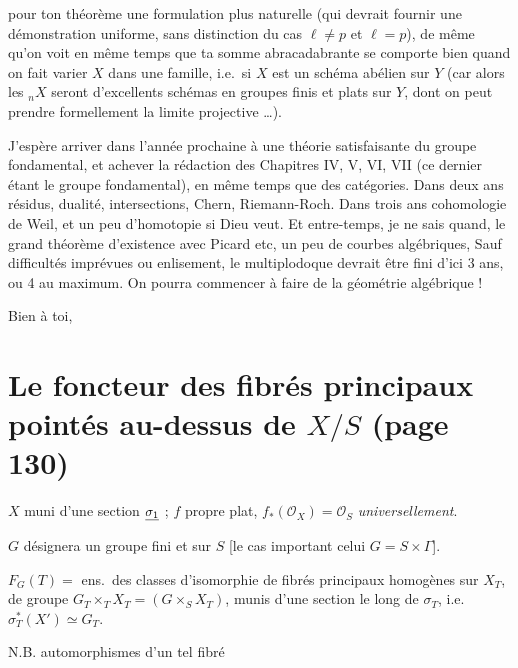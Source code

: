 \documentclass[11pt,a4paper]{article}
\begin{document}

pour ton théorème une formulation plus naturelle (qui devrait \struck{\ill{}}
fournir une démonstration uniforme, sans distinction du cas $\ell \neq p$ et
$\ell = p$), de même qu'on voit en même temps que ta somme abracadabrante se
comporte bien quand on fait varier $X$ dans une famille, i.e.\ si $X$ est
\struck{\ill{}} un schéma abélien sur $Y$ (car alors les ${}_{n}X$ seront
d'excellents schémas en groupes finis et plats sur $Y$, dont on peut prendre
formellement la limite projective \ldots).

J'espère arriver dans l'année prochaine à une théorie satisfaisante du groupe
fondamental, \struck{\ill{}} et achever la rédaction des Chapitres IV, V, VI,
VII (ce dernier étant le groupe fondamental), en même temps que des catégories.
Dans deux ans résidus, dualité, intersections, Chern, Riemann-Roch. Dans trois
ans cohomologie de Weil, et un peu d'homotopie si Dieu veut. Et entre-temps, je
ne sais quand, le grand théorème d'existence avec Picard etc, un peu de courbes
algébriques,  Sauf difficultés imprévues ou
enlisement, le multiplodoque devrait être fini d'ici 3 ans, ou 4 au maximum. On
pourra commencer à faire de la géométrie algébrique !

Bien à toi,

\section*{Le foncteur des fibrés principaux pointés au-dessus de $X/S$ (page 130)}


$X$ \ill{} muni d'une section $\uncertain{\sigma_{1}}$ ; $f$ propre plat,
$f_{*}(\mathcal{O}_{X}) = \mathcal{O}_{S}$ \emph{universellement}.


$G$ désignera un groupe \struck{\ill{}} fini et 
 sur $S$ [le cas important \ill{} celui \ill{} $G = S \times
\Gamma$].

$F_{G}(T) = $ ens.\ des classes d'isomorphie \ill{} de fibrés principaux
homogènes sur $X_{T}$, de groupe $G_{T} \times_{T} X_{T} = (G \times_{S}
X_{T})$, munis d'une section \ill{} le long de $\sigma_{T}$, i.e.\
$\sigma_{T}^{*}(X') \simeq G_{T}$.

N.B. \ill{} automorphismes d'un tel fibré \ill{} \marginal{$= $ pour $G$
commutatif, les \ill{}}
\end{document}
